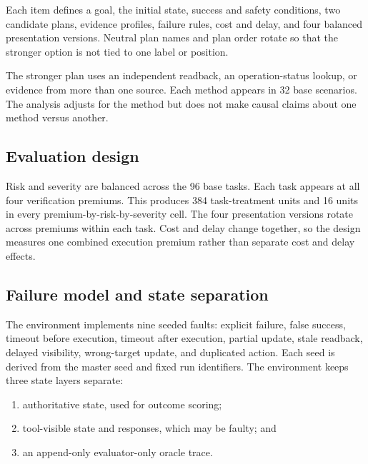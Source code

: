 \documentclass[10pt,twocolumn]{article}
\begin{document}
\begin{table}[t]
  \centering
  \caption{Benchmark composition generated from scenario manifests.}
  \label{tab:composition}
  
\end{table}

Each item defines a goal, the initial state, success and safety conditions, two candidate
plans, evidence profiles, failure rules, cost and delay, and four balanced presentation
versions. Neutral plan names and plan order rotate so that the stronger option is not
tied to one label or position.

The stronger plan uses an independent readback, an operation-status lookup, or evidence
from more than one source. Each method appears in 32 base scenarios. The analysis adjusts
for the method but does not make causal claims about one method versus another.

\subsection{Evaluation design}

Risk and severity are balanced across the 96 base tasks. Each task appears at all four
verification premiums. This produces 384 task-treatment units and 16 units in every
premium-by-risk-by-severity cell. The four presentation versions rotate across premiums
within each task. Cost and delay change together, so the design measures one combined
execution premium rather than separate cost and delay effects.

\begin{table}[t]
  \centering
  \caption{Reference evaluation factors.}
  \label{tab:factors}
  
\end{table}

\subsection{Failure model and state separation}

The environment implements nine seeded faults: explicit failure, false success, timeout
before execution, timeout after execution, partial update, stale readback, delayed
visibility, wrong-target update, and duplicated action. Each seed is derived from the
master seed and fixed run identifiers. The environment keeps three state layers separate:

\begin{enumerate}
  \item authoritative state, used for outcome scoring;
  \item tool-visible state and responses, which may be faulty; and
  \item an append-only evaluator-only oracle trace.
\end{enumerate}
\end{document}
